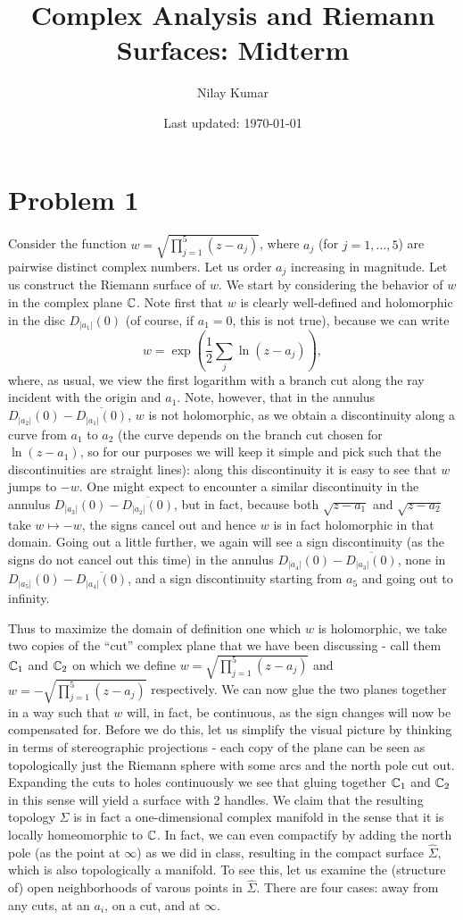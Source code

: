 \documentclass{../mathnotes}
\title{Complex Analysis and Riemann Surfaces: Midterm}
\author{Nilay Kumar}
\date{Last updated: \today}
\begin{document}
\maketitle

\section*{Problem 1}

Consider the function $w=\sqrt{\prod_{j=1}^5(z-a_j)}$, where $a_j$ (for $j=1,\ldots,5$) are pairwise distinct complex numbers. Let us order $a_j$
increasing in magnitude.
Let us construct the Riemann surface of $w$. We start by considering the behavior of $w$ in the complex plane $\mathbb{C}$. Note first that $w$
is clearly well-defined and holomorphic in the disc $D_{|a_1|}(0)$ (of course, if $a_1=0$, this is not true), because we can write
\[w=\exp\left( \frac{1}{2}\sum_j \ln(z-a_j) \right),\]
where, as usual, we view the first logarithm with a branch cut along the ray incident with the origin and $a_1$. Note, however, that
in the annulus $D_{|a_2|}(0)-\overline{D_{|a_1|}(0)}$, $w$ is not holomorphic, as we obtain a discontinuity along a curve from $a_1$ to $a_2$
(the curve depends on the branch cut chosen for $\ln(z-a_1)$, so for our purposes we will keep it simple and pick such that the discontinuities are straight lines):
along this discontinuity it is easy to see that $w$ jumps to $-w$. One might expect to encounter a similar discontinuity in the annulus $D_{|a_3|}(0)-\overline{D_{|a_2|}(0)}$,
but in fact, because both $\sqrt{z-a_1}$ and $\sqrt{z-a_2}$ take $w\mapsto -w$, the signs cancel out and hence $w$ is in fact holomorphic in that domain.
Going out a little further, we again will see a sign discontinuity (as the signs do not cancel out this time) in the annulus $D_{|a_4|}(0)-\overline{D_{|a_3|}(0)}$,
none in $D_{|a_5|}(0)-\overline{D_{|a_4|}(0)}$, and a sign discontinuity starting from $a_5$ and going out to infinity.

Thus to maximize the domain of definition one which $w$ is holomorphic, we take two copies of the ``cut'' complex plane that we have been discussing - call them $\mathbb{C}_1$
and $\mathbb{C}_2$ on which we define $w=\sqrt{\prod_{j=1}^5(z-a_j)}$ and $w=-\sqrt{\prod_{j=1}^5(z-a_j)}$ respectively. We can now glue the two planes together in a way
such that $w$ will, in fact, be continuous, as the sign changes will now be compensated for. Before we do this, let us simplify the visual picture by
thinking in terms of stereographic projections - each copy of the plane can be seen as topologically just the Riemann sphere with some arcs and the north pole cut out.
Expanding the cuts to holes continuously we see that gluing together $\mathbb{C}_1$ and $\mathbb{C}_2$ in this sense will yield a surface with 2 handles. We claim that the resulting
topology $\Sigma$ is in fact a one-dimensional complex manifold in the sense that it is locally homeomorphic to $\mathbb{C}$. In fact, we can even compactify by adding
the north pole (as the point at $\infty$) as we did in class, resulting in the compact surface $\hat\Sigma$, which is also topologically a manifold. To see this,
let us examine the (structure of) open neighborhoods of varous points in $\hat\Sigma$. There are four cases: away from any cuts, at an $a_i$, on a cut, and at $\infty$.
\end{document}
